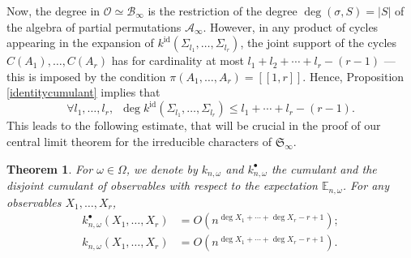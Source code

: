 \documentclass[smallextended,nospthms]{svjour3}
\newtheorem{theorem}{Theorem}
\theoremstyle{remark}
\newcommand{\sym}{\mathfrak{S}}
\newcommand{\esper}{\mathbb{E}}
\newcommand{\lle}{\left[\!\left[}
\newcommand{\rre}{\right]\!\right]}
\newcommand{\obs}{\mathscr{O}}
\newcommand{\alg}{\mathscr{A}}
\newcommand{\blg}{\mathscr{B}}
\newcommand{\id}{\mathrm{id}}
\begin{document}
Now, the degree in $\obs \simeq \blg_{\infty}$ is the restriction of the degree $\deg(\sigma,S)=|S|$ of the algebra of partial permutations $\alg_{\infty}$. However, in any product of cycles appearing in the expansion of $k^{\id} (\varSigma_{l_{1}},\ldots,\varSigma_{l_{r}})$, the joint support of the cycles $C(A_{1}),\ldots,C(A_{r})$ has for cardinality at most $l_{1}+l_{2}+\cdots+l_{r}-(r-1)$ --- this is imposed by the condition $\pi(A_{1},\ldots,A_{r})=\lle 1,r\rre$. Hence, Proposition \ref{identitycumulant} implies that
$$\forall l_{1},\ldots,l_{r},\,\,\,\deg k^{\id}(\varSigma_{l_{1}},\ldots,\varSigma_{l_{r}}) \leq l_{1}+\cdots+l_{r}-(r-1).$$
This leads to the following estimate, that will be crucial in the proof of our central limit theorem for the irreducible characters of $\sym_{\infty}$.
\begin{theorem}\label{estimate}
For $\omega \in \Omega$, we denote by $k_{n,\omega}$ and $k_{n,\omega}^{\bullet}$ the cumulant and the disjoint cumulant of observables with respect to the expectation $\esper_{n,\omega}$. For any observables $X_{1},\ldots,X_{r}$, 
\begin{align*}k_{n,\omega}^{\bullet}(X_{1},\ldots,X_{r})&=O\left(n^{\deg X_{1} +\cdots+\deg X_{r}-r+1}\right);\\
k_{n,\omega}(X_{1},\ldots,X_{r})&=O\left(n^{\deg X_{1} +\cdots+\deg X_{r}-r+1}\right). 
\end{align*}
\end{theorem}
\end{document}
